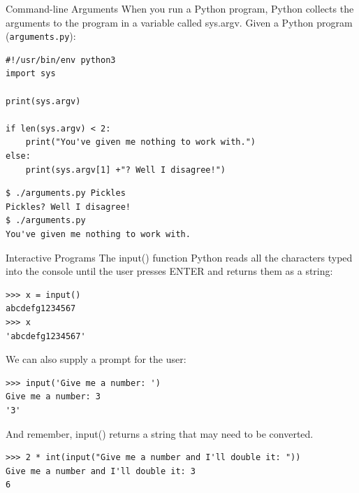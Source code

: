 \documentclass[smaller, aspectratio=1610]{beamer}
\begin{document}
\begin{frame}[label={sec:orgb75c8b5},fragile]{Command-line Arguments}
 When you run a Python program, Python collects the arguments to the program in a variable called sys.argv. Given a Python program (\texttt{arguments.py}):

\lstset{language=Python,label= ,caption= ,captionpos=b,numbers=none}
\begin{lstlisting}
#!/usr/bin/env python3
import sys

print(sys.argv)

if len(sys.argv) < 2:
    print("You've given me nothing to work with.")
else:
    print(sys.argv[1] +"? Well I disagree!")
\end{lstlisting}

\lstset{language=Python,label= ,caption= ,captionpos=b,numbers=none}
\begin{lstlisting}
$ ./arguments.py Pickles
Pickles? Well I disagree!
$ ./arguments.py
You've given me nothing to work with.
\end{lstlisting}
\end{frame}

\begin{frame}[label={sec:org64dc221},fragile]{Interactive Programs}
 The input() function Python reads all the characters typed into the console until the user presses ENTER and returns them as a string:

\lstset{language=Python,label= ,caption= ,captionpos=b,numbers=none}
\begin{lstlisting}
>>> x = input()
abcdefg1234567
>>> x
'abcdefg1234567'
\end{lstlisting}

We can also supply a prompt for the user:

\lstset{language=Python,label= ,caption= ,captionpos=b,numbers=none}
\begin{lstlisting}
>>> input('Give me a number: ')
Give me a number: 3
'3'
\end{lstlisting}

And remember, input() returns a string that may need to be converted.

\lstset{language=Python,label= ,caption= ,captionpos=b,numbers=none}
\begin{lstlisting}
>>> 2 * int(input("Give me a number and I'll double it: "))
Give me a number and I'll double it: 3
6
\end{lstlisting}
\end{frame}
\end{document}
